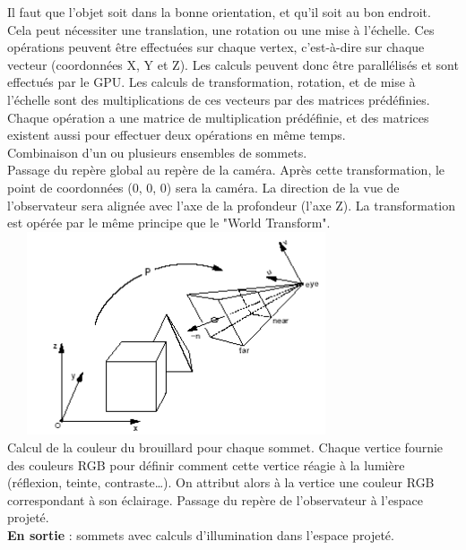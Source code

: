 Il faut que l’objet soit dans la bonne orientation, et qu’il soit au bon endroit. Cela peut nécessiter une translation, une rotation ou une mise à l’échelle. Ces opérations peuvent être effectuées sur chaque vertex, c’est-à-dire sur chaque vecteur (coordonnées X, Y et Z). Les calculs peuvent donc être parallélisés et sont effectués par le GPU. Les calculs de transformation, rotation, et de mise à l’échelle sont des multiplications de ces vecteurs par des matrices prédéfinies. Chaque opération a une matrice de multiplication prédéfinie, et des matrices existent aussi pour effectuer deux opérations en même temps.\\
Combinaison d’un ou plusieurs ensembles de sommets.\\
Passage du repère global au repère de la caméra. Après cette transformation, le point de coordonnées (0, 0, 0) sera la caméra. La direction de la vue de l’observateur sera alignée avec l'axe de la profondeur (l'axe Z). La transformation est opérée par le même principe que le "World Transform".\\
\includegraphics[width=10cm,height=60mm]{leo/images/repereCamera.png}\\
Calcul de la couleur du brouillard pour chaque sommet.
Chaque vertice fournie des couleurs RGB pour définir comment cette vertice réagie à la lumière (réflexion, teinte, contraste…). On attribut alors à la vertice une couleur RGB correspondant à son éclairage.
Passage du repère de l'observateur à l'espace projeté.\\

\textbf{En sortie} : sommets avec calculs d’illumination dans l’espace projeté.

